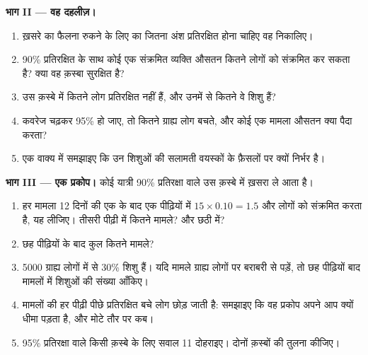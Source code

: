 \begin{problem}
\medskip
\noindent\textbf{भाग II --- वह दहलीज़।}
\begin{enumerate}[resume]
  \item ख़सरे का फैलना रुकने के लिए  का जितना अंश प्रतिरक्षित होना
        चाहिए वह निकालिए।
  \item 90\% प्रतिरक्षित के साथ कोई एक संक्रमित व्यक्ति औसतन कितने लोगों को
        संक्रमित कर सकता है? क्या वह क़स्बा सुरक्षित है?
  \item उस क़स्बे में कितने लोग प्रतिरक्षित नहीं हैं, और उनमें से कितने वे
        शिशु हैं?
  \item कवरेज चढ़कर 95\% हो जाए, तो कितने ग्राह्य लोग बचते, और कोई एक मामला
        औसतन क्या पैदा करता?
  \item एक वाक्य में समझाइए कि उन शिशुओं की सलामती वयस्कों के फ़ैसलों पर
        क्यों निर्भर है।
\end{enumerate}

\medskip
\noindent\textbf{भाग III --- एक प्रकोप।}
कोई यात्री 90\% प्रतिरक्षा वाले उस क़स्बे में ख़सरा ले आता है।
\begin{enumerate}[resume]
  \item हर मामला 12 दिनों की एक के बाद एक पीढ़ियों में
        $15 \times 0.10 = 1.5$ और लोगों को संक्रमित करता है, यह लीजिए।
        तीसरी पीढ़ी में कितने मामले? और छठी में?
  \item छह पीढ़ियों के बाद कुल कितने मामले?
  \item 5000 ग्राह्य लोगों में से 30\% शिशु हैं। यदि मामले ग्राह्य लोगों पर
        बराबरी से पड़ें, तो छह पीढ़ियों बाद मामलों में शिशुओं की संख्या
        आँकिए।
  \item मामलों की हर पीढ़ी पीछे प्रतिरक्षित बचे लोग छोड़ जाती है: समझाइए कि
        वह प्रकोप अपने आप क्यों धीमा पड़ता है, और मोटे तौर पर कब।
  \item 95\% प्रतिरक्षा वाले किसी क़स्बे के लिए सवाल 11 दोहराइए। दोनों
        क़स्बों की तुलना कीजिए।
\end{enumerate}


\end{problem}
